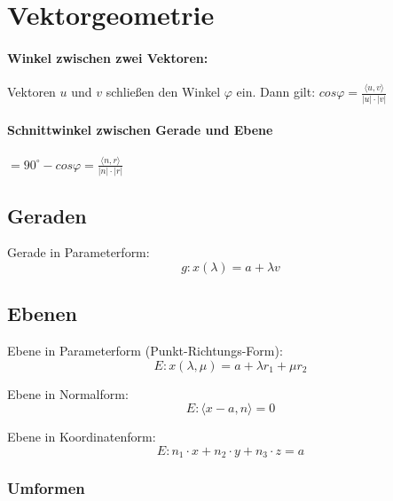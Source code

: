 \documentclass[a4paper, twocolumn]{article}
\begin{document}
\section{Vektorgeometrie}
	\paragraph{Winkel zwischen zwei Vektoren:} Vektoren $u$ und $v$ schließen den Winkel $\varphi$ ein. Dann gilt:
	$cos \varphi = \frac{\langle u, v \rangle}{|u| \cdot |v|}$	
	
	\paragraph{Schnittwinkel zwischen Gerade und Ebene}
	$= 90^\circ - cos \varphi = \frac{\langle n, r \rangle}{|n| \cdot |r|}$	

\subsection{Geraden}
    Gerade in Parameterform:
    \begin{displaymath}
       g\colon x(\lambda) = a + \lambda v
    \end{displaymath}


\subsection{Ebenen}
    Ebene in Parameterform (Punkt-Richtungs-Form):
    \begin{displaymath}
       E:	x(\lambda, \mu) = a + \lambda r_1 + \mu r_2
    \end{displaymath}
    
    Ebene in Normalform:
    \begin{displaymath}
       E:	\langle x - a, n \rangle = 0
    \end{displaymath}
    
    Ebene in Koordinatenform:
    \begin{displaymath}
       E: n_1 \cdot x + n_2 \cdot y + n_3 \cdot z = a
    \end{displaymath}

   \subsubsection{Umformen}
\end{document}
